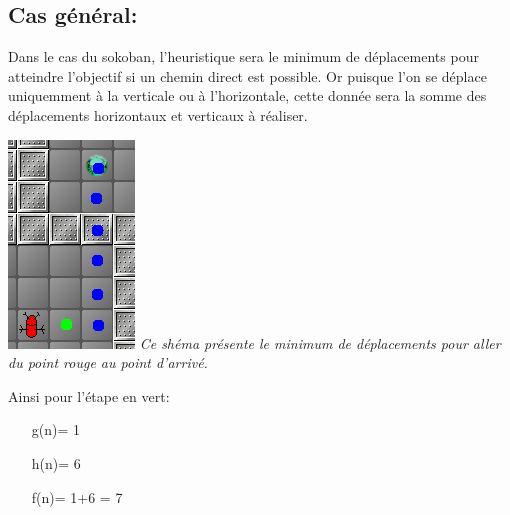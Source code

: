 \documentclass{article}
\begin{document}
\subsection{Cas général:}
Dans le cas du sokoban, l'heuristique sera le minimum  de déplacements pour atteindre l'objectif si un chemin direct est possible. Or puisque l'on se déplace uniquemment à la verticale ou à l'horizontale, cette donnée sera la somme des déplacements horizontaux et verticaux à réaliser.
\begin{center}
\includegraphics[scale=1]{images/heuristic.png} \newline
\textit{Ce shéma présente le minimum de déplacements pour aller du point rouge au point d'arrivé.}
\end{center}
Ainsi pour l'étape en vert:
\begin{itemize}
\item[g(n)= 1]
\item[h(n)= 6]
\item[f(n)= 1+6 = 7]
\end{itemize}



\newpage
\end{document}
